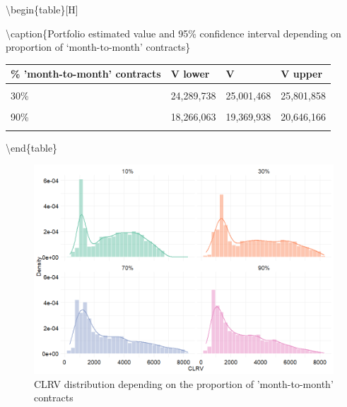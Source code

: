 \documentclass[
]{book}
\begin{document}
\textbackslash begin\{table\}{[}H{]}

\textbackslash caption\{\label{tab:unnamed-chunk-30}Portfolio estimated value and 95\% confidence interval depending on proportion of `month-to-month' contracts\}
\centering

\begin{tabular}[t]{llll}
\toprule
\% 'month-to-month' contracts & V lower & V & V upper\\
\midrule
\cellcolor{gray!6}{10\%} & \cellcolor{gray!6}{22,526,500} & \cellcolor{gray!6}{23,009,290} & \cellcolor{gray!6}{23,535,331}\\
30\% & 24,289,738 & 25,001,468 & 25,801,858\\
\cellcolor{gray!6}{70\%} & \cellcolor{gray!6}{19,763,605} & \cellcolor{gray!6}{20,706,782} & \cellcolor{gray!6}{21,796,005}\\
90\% & 18,266,063 & 19,369,938 & 20,646,166\\
\cellcolor{gray!6}{55.1\% (reference)} & \cellcolor{gray!6}{17,604,144} & \cellcolor{gray!6}{18,270,000} & \cellcolor{gray!6}{19,031,648}\\
\bottomrule
\end{tabular}

\textbackslash end\{table\}

\begin{figure}

{\centering \includegraphics[width=13.89in]{./imgs/clrv_month_to_month} 

}

\caption{CLRV distribution depending on the proportion of 'month-to-month' contracts}\label{fig:clrvmonthtomonth}
\end{figure}
\end{document}
